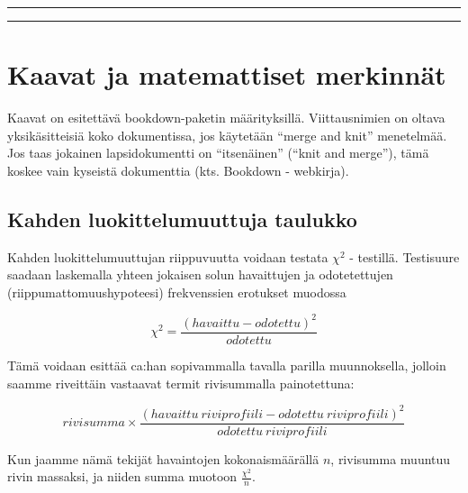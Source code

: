 \documentclass[finnish,]{book}
\theoremstyle{definition}
\theoremstyle{definition}
\theoremstyle{definition}
\theoremstyle{remark}
\begin{document}
\begin{center}\rule{0.5\linewidth}{\linethickness}\end{center}

\begin{center}\rule{0.5\linewidth}{\linethickness}\end{center}

\hypertarget{kaavat-ja-matemattiset-merkinnat}{%
\chapter{Kaavat ja matemattiset
merkinnät}\label{kaavat-ja-matemattiset-merkinnat}}

Kaavat on esitettävä bookdown-paketin määrityksillä. Viittausnimien on
oltava yksikäsitteisiä koko dokumentissa, jos käytetään ``merge and
knit'' menetelmää. Jos taas jokainen lapsidokumentti on ``itsenäinen''
(``knit and merge''), tämä koskee vain kyseistä dokumenttia (kts.
Bookdown - webkirja).

\hypertarget{kahden-luokittelumuuttuja-taulukko}{%
\section{Kahden luokittelumuuttuja
taulukko}\label{kahden-luokittelumuuttuja-taulukko}}

Kahden luokittelumuuttujan riippuvuutta voidaan testata \(\chi^{2}\) -
testillä. Testisuure saadaan laskemalla yhteen jokaisen solun
havaittujen ja odotetettujen (riippumattomuushypoteesi) frekvenssien
erotukset muodossa

\begin{equation}

  \chi^{2} = \frac{(havaittu - odotettu)^2} {odotettu}
  
  \label{eq:khii21}

\end{equation}

Tämä voidaan esittää ca:han sopivammalla tavalla parilla muunnoksella,
jolloin saamme riveittäin vastaavat termit rivisummalla painotettuna:

\begin{equation}

  rivisumma \times \frac{(havaittu \: riviprofiili - odotettu \: riviprofiili)^2} {odotettu \: riviprofiili}
  
  \label{eq:khii22}
  
\end{equation}

Kun jaamme nämä tekijät havaintojen kokonaismäärällä \(n\), rivisumma
muuntuu rivin massaksi, ja niiden summa muotoon \(\frac{\chi^{2}}{n}\).
\end{document}
